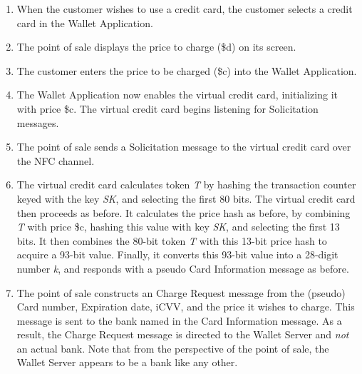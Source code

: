 \begin{enumerate}
\item When the customer wishes to use a credit card, the customer selects a credit card in the Wallet Application.

\item The point of sale displays the price to charge (\$d) on its screen.

\item The customer enters the price to be charged (\$c) into the Wallet Application.

\item The Wallet Application now enables the virtual credit card, initializing it with price \$c.
    The virtual credit card begins listening for Solicitation messages.

\item The point of sale sends a Solicitation message to the virtual credit card over the NFC channel.

\item
    The virtual credit card calculates token \emph{T} by hashing the transaction counter keyed with the key \emph{SK}, and selecting the first 80 bits.
    The virtual credit card then proceeds as before.
    It calculates the price hash as before, by combining \emph{T} with price \$c,
        hashing this value with key \emph{SK}, and selecting the first 13 bits.
    It then combines the 80-bit token \emph{T} with this 13-bit price hash to acquire a 93-bit value.
    Finally, it converts this 93-bit value into a 28-digit number \emph{k}, and responds with a pseudo Card Information message as before.

\item The point of sale constructs an Charge Request message from the (pseudo) Card number, Expiration date, iCVV, and the price it wishes to charge.
    This message is sent to the bank named in the Card Information message.
    As a result, the Charge Request message is directed to the Wallet Server and \emph{not} an actual bank.
    Note that from the perspective of the point of sale, the Wallet Server appears to be a bank like any other.


\end{enumerate}
